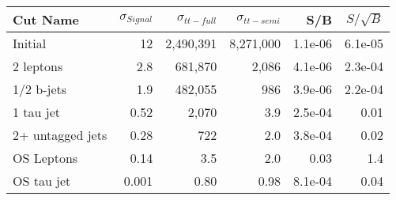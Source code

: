 \begin{tabular}{lrrrrr}
\toprule
         Cut Name &  $\sigma_{Signal}$ &  $\sigma_{tt-full}$ &  $\sigma_{tt-semi}$ &     S/B &  $S/\sqrt{B}$ \\
\midrule
          Initial &                 12 &           2,490,391 &           8,271,000 & 1.1e-06 &       6.1e-05 \\
        2 leptons &                2.8 &             681,870 &               2,086 & 4.1e-06 &       2.3e-04 \\
       1/2 b-jets &                1.9 &             482,055 &                 986 & 3.9e-06 &       2.2e-04 \\
        1 tau jet &               0.52 &               2,070 &                 3.9 & 2.5e-04 &          0.01 \\
 2+ untagged jets &               0.28 &                 722 &                 2.0 & 3.8e-04 &          0.02 \\
       OS Leptons &               0.14 &                 3.5 &                 2.0 &    0.03 &           1.4 \\
       OS tau jet &              0.001 &                0.80 &                0.98 & 8.1e-04 &          0.04 \\
\bottomrule
\end{tabular}
